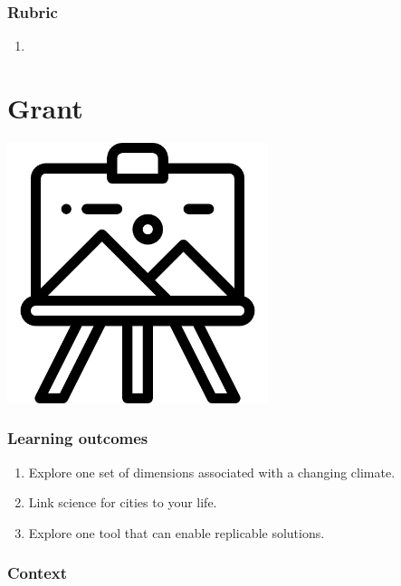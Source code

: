 \documentclass[
]{book}
\providecommand{\tightlist}{%
  \setlength{\itemsep}{0pt}\setlength{\parskip}{0pt}}
\begin{document}
\hypertarget{rubric}{%
\subsection*{Rubric}\label{rubric}}

\begin{enumerate}
\def\labelenumi{\arabic{enumi}.}
\tightlist
\item
\end{enumerate}

\hypertarget{grant}{%
\chapter{Grant}\label{grant}}

\includegraphics[width=3in,height=\textheight]{./grant.png}

\hypertarget{learning-outcomes-2}{%
\subsection*{Learning outcomes}\label{learning-outcomes-2}}

\begin{enumerate}
\def\labelenumi{\arabic{enumi}.}
\tightlist
\item
  Explore one set of dimensions associated with a changing climate.
\item
  Link science for cities to your life.\\
\item
  Explore one tool that can enable replicable solutions.
\end{enumerate}

\hypertarget{context-1}{%
\subsection*{Context}\label{context-1}}
\end{document}
